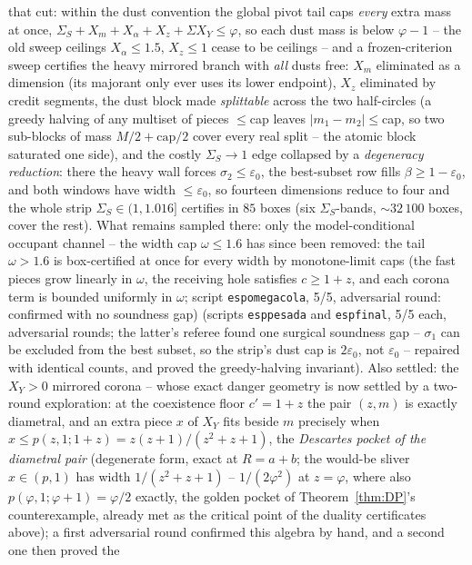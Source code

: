 \documentclass[11pt]{article}
\theoremstyle{definition}
\begin{document}
that cut: within the dust convention the global pivot tail caps
\emph{every} extra mass at once,
$\Sigma_S+X_m+X_\alpha+X_z+\Sigma X_Y\le\varphi$, so each dust
mass is below $\varphi-1$ -- the old sweep ceilings
$X_\alpha\le1.5$, $X_z\le1$ cease to be ceilings -- and a
frozen-criterion sweep certifies the heavy mirrored branch with
\emph{all} dusts free: $X_m$ eliminated as a dimension (its
majorant only ever uses its lower endpoint), $X_z$ eliminated by
credit segments, the dust block made \emph{splittable} across the
two half-circles (a greedy halving of any multiset of pieces
$\le$cap leaves $|m_1-m_2|\le$cap, so two sub-blocks of mass
$M/2+\text{cap}/2$ cover every real split -- the atomic block
saturated one side), and the costly $\Sigma_S\to1$ edge collapsed
by a \emph{degeneracy reduction}: there the heavy wall forces
$\sigma_2\le\varepsilon_0$, the best-subset row fills
$\beta\ge1-\varepsilon_0$, and both windows have width
$\le\varepsilon_0$, so fourteen dimensions reduce to four and the
whole strip $\Sigma_S\in(1,1.016]$ certifies in $85$ boxes
(six $\Sigma_S$-bands, $\sim32\,100$ boxes, cover the rest).
What remains sampled there: only the model-conditional occupant
channel -- the width cap $\omega\le1.6$ has since been removed: the
tail $\omega>1.6$ is box-certified at once for every width by
monotone-limit caps (the fast pieces grow linearly in $\omega$, the
receiving hole satisfies $c\ge1+z$, and each corona term is bounded
uniformly in $\omega$; script \texttt{espomegacola}, 5/5,
adversarial round: confirmed with no soundness gap)
(scripts \texttt{esppesada} and \texttt{espfinal}, 5/5 each,
adversarial rounds; the latter's referee found one surgical
soundness gap -- $\sigma_1$ can be excluded from the best subset,
so the strip's dust cap is $2\varepsilon_0$, not $\varepsilon_0$
-- repaired with identical counts, and proved the greedy-halving
invariant). Also settled: the $X_Y>0$ mirrored corona -- whose exact danger
geometry is now settled by a two-round exploration: at the
coexistence floor $c'=1+z$ the pair $(z,m)$ is exactly diametral,
and an extra piece $x$ of $X_Y$ fits beside $m$ precisely when
$x\le p(z,1;1+z)=z(z+1)/(z^2+z+1)$, the \emph{Descartes pocket of
the diametral pair} (degenerate form, exact at $R=a+b$; the
would-be sliver $x\in(p,1)$ has width $1/(z^2+z+1)$ --
$1/(2\varphi^2)$ at $z=\varphi$, where also
$p(\varphi,1;\varphi+1)=\varphi/2$ exactly, the golden pocket of
Theorem~\ref{thm:DP}'s counterexample, already met as the critical
point of the duality certificates above); a first adversarial round
confirmed this algebra by hand, and a second one then proved the
\end{document}
